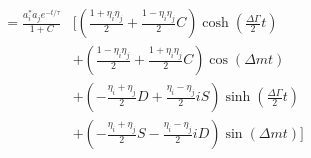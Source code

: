 \documentclass[a4paper,9pt,twosided]{article}
\begin{document}
\begin{eqnarray}
                                &= \frac{ a_i^* a_j e^{-t/\tau}} {1+C}&\Biggl[ \left( \frac{1+\eta_i\eta_j}{2} +  \frac{1-\eta_i\eta_j}{2}C\right) \cosh\left(\frac{\Delta\Gamma}{2}t\right)\nonumber \\
                                                                          &&  +\left( \frac{1-\eta_i\eta_j}{2} +  \frac{1+\eta_i\eta_j}{2}C\right) \cos(\Delta m t) \nonumber\\
                                                                          &&  +\left(-\frac{\eta_i+\eta_j}{2}D + \frac{\eta_i-\eta_j}{2}iS\right) \sinh\left(\frac{\Delta\Gamma}{2}t\right) \nonumber\\
                                                                          &&  +\left(-\frac{\eta_i+\eta_j}{2}S - \frac{\eta_i-\eta_j}{2}iD\right) \sin(\Delta m t) \Biggr] 
\end{eqnarray}
\end{document}
